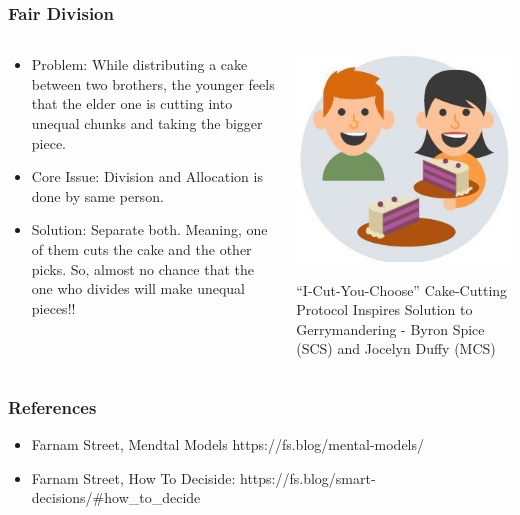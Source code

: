 \begin{frame}[fragile]\frametitle{Fair Division}
\begin{columns}
    \begin{column}[T]{0.6\linewidth}
      \begin{itemize}
		\item Problem: While distributing a cake between two brothers, the younger feels that the elder one is cutting into unequal chunks and taking the bigger piece.
		\item Core Issue: Division and Allocation is done by same person.
		\item Solution: Separate both. Meaning, one of them cuts the cake and the other picks. So, almost no chance that the one who divides will make unequal pieces!!
	  \end{itemize}

    \end{column}
    \begin{column}[T]{0.4\linewidth}
		\begin{center}
		\includegraphics[width=0.8\linewidth,keepaspectratio]{images/game_theory_fair_division}
		
		{\small ``I-Cut-You-Choose'' Cake-Cutting Protocol Inspires Solution to Gerrymandering - 
Byron Spice (SCS) and Jocelyn Duffy (MCS)}
		\end{center}	
    \end{column}
  \end{columns}
\end{frame}

\begin{frame}[fragile]\frametitle{References}
\begin{itemize}
\item Farnam Street, Mendtal Models https://fs.blog/mental-models/

\item Farnam Street, How To Deciside: https://fs.blog/smart-decisions/\#how\_to\_decide
\end{itemize}
\end{frame}